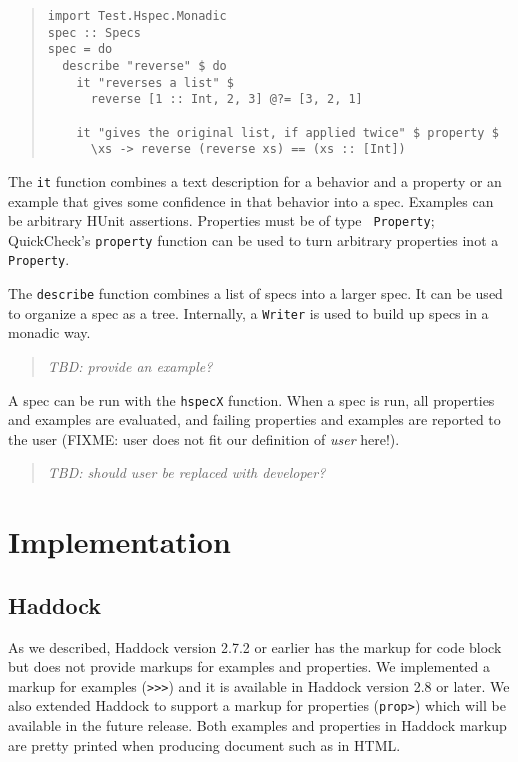 \documentclass[preprint]{sigplanconf}
\begin{document}
\begin{quote}
\small
\begin{verbatim}
import Test.Hspec.Monadic
spec :: Specs
spec = do
  describe "reverse" $ do
    it "reverses a list" $
      reverse [1 :: Int, 2, 3] @?= [3, 2, 1]

    it "gives the original list, if applied twice" $ property $
      \xs -> reverse (reverse xs) == (xs :: [Int])
\end{verbatim}
\end{quote}

\noindent The {\tt it} function combines a text description for a behavior and
a property or an example that gives some confidence in that behavior into a
spec.
Examples can be arbitrary HUnit assertions.  Properties must be of type {\tt
Property}; QuickCheck's \texttt{property} function can be used to turn
arbitrary properties inot a \texttt{Property}.

The \texttt{describe} function combines a list of specs into a larger spec.  It
can be used to organize a spec as a tree.
Internally, a \texttt{Writer} is used to build up specs in a monadic way.

\begin{quote}
    \emph{TBD: provide an example?}
\end{quote}

A spec can be run with the \texttt{hspecX} function.  When a spec is run, all
properties and examples are evaluated, and failing properties and examples are
reported to the user (FIXME: user does not fit our definition of \emph{user}
here!).

\begin{quote}
    \emph{TBD: should user be replaced with developer?}
\end{quote}


\section{Implementation}

\subsection{Haddock}

As we described, Haddock version 2.7.2 or earlier has
the markup for code block but does not provide
markups for examples and properties.
We implemented a markup for examples ({\tt >>>}) and 
it is available in Haddock version 2.8 or later.
We also extended Haddock to support a markup for
properties ({\tt prop>})
which will be available in the future release.
Both examples and properties in Haddock markup are pretty printed when producing document
such as in HTML.
\end{document}
